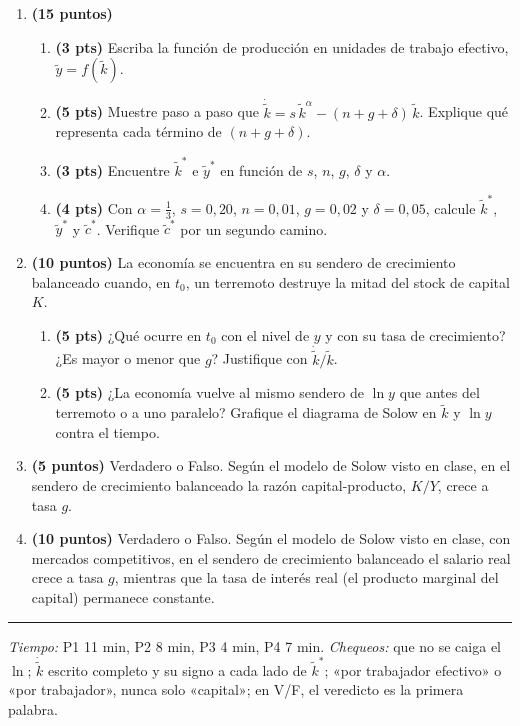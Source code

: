 \documentclass[11pt]{article}
\begin{document}
\begin{enumerate}[leftmargin=*, itemsep=12pt]

\item \textbf{(15 puntos)}
\begin{enumerate}[label=\alph*), leftmargin=*, itemsep=4pt]
\item \textbf{(3 pts)} Escriba la función de producción en unidades de trabajo efectivo, $\tilde y = f(\tilde k)$.
\item \textbf{(5 pts)} Muestre paso a paso que
\(
\dot{\tilde k} = s\,\tilde k^{\alpha} - (n + g + \delta)\,\tilde k
\).
Explique qué representa cada término de $(n+g+\delta)$.
\item \textbf{(3 pts)} Encuentre $\tilde k^{*}$ e $\tilde y^{*}$ en función de $s$, $n$, $g$, $\delta$ y $\alpha$.
\item \textbf{(4 pts)} Con $\alpha = \tfrac{1}{3}$, $s = 0{,}20$, $n = 0{,}01$, $g = 0{,}02$ y $\delta = 0{,}05$, calcule $\tilde k^{*}$, $\tilde y^{*}$ y $\tilde c^{*}$. Verifique $\tilde c^{*}$ por un segundo camino.
\end{enumerate}

\item \textbf{(10 puntos)} La economía se encuentra en su sendero de crecimiento balanceado cuando, en $t_0$, un terremoto destruye la mitad del stock de capital $K$.
\begin{enumerate}[label=\alph*), leftmargin=*, itemsep=4pt]
\item \textbf{(5 pts)} ¿Qué ocurre en $t_0$ con el nivel de $y$ y con su tasa de crecimiento? ¿Es mayor o menor que $g$? Justifique con $\dot{\tilde k}/\tilde k$.
\item \textbf{(5 pts)} ¿La economía vuelve al mismo sendero de $\ln y$ que antes del terremoto o a uno paralelo? Grafique el diagrama de Solow en $\tilde k$ y $\ln y$ contra el tiempo.
\end{enumerate}

\item \textbf{(5 puntos)} Verdadero o Falso. Según el modelo de Solow visto en clase, en el sendero de crecimiento balanceado la razón capital-producto, $K/Y$, crece a tasa $g$.

\item \textbf{(10 puntos)} Verdadero o Falso. Según el modelo de Solow visto en clase, con mercados competitivos, en el sendero de crecimiento balanceado el salario real crece a tasa $g$, mientras que la tasa de interés real (el producto marginal del capital) permanece constante.

\end{enumerate}

\medskip
\hrule
\smallskip
{\small\textit{Tiempo:} P1 11 min, P2 8 min, P3 4 min, P4 7 min. \textit{Chequeos:} que no se caiga el $\ln$; $\dot{\tilde k}$ escrito completo y su signo a cada lado de $\tilde k^{*}$; «por trabajador efectivo» o «por trabajador», nunca solo «capital»; en V/F, el veredicto es la primera palabra.}
\end{document}
